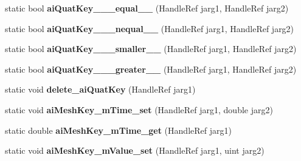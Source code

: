 \begin{DoxyCompactItemize}
\item 
\hypertarget{class_assimp_p_i_n_v_o_k_e_ade207a32ddd5e5c0709395fc4a9bd359}{static bool {\bfseries ai\+Quat\+Key\+\_\+\+\_\+\+\_\+equal\+\_\+\+\_\+} (Handle\+Ref jarg1, Handle\+Ref jarg2)}\label{class_assimp_p_i_n_v_o_k_e_ade207a32ddd5e5c0709395fc4a9bd359}

\item 
\hypertarget{class_assimp_p_i_n_v_o_k_e_a4d29858045ee8985313385b4518e2780}{static bool {\bfseries ai\+Quat\+Key\+\_\+\+\_\+\+\_\+nequal\+\_\+\+\_\+} (Handle\+Ref jarg1, Handle\+Ref jarg2)}\label{class_assimp_p_i_n_v_o_k_e_a4d29858045ee8985313385b4518e2780}

\item 
\hypertarget{class_assimp_p_i_n_v_o_k_e_a38a01fd38b68fd1f6158520353704a3c}{static bool {\bfseries ai\+Quat\+Key\+\_\+\+\_\+\+\_\+smaller\+\_\+\+\_\+} (Handle\+Ref jarg1, Handle\+Ref jarg2)}\label{class_assimp_p_i_n_v_o_k_e_a38a01fd38b68fd1f6158520353704a3c}

\item 
\hypertarget{class_assimp_p_i_n_v_o_k_e_a57720d5b6dbc566f38168deb5caab59e}{static bool {\bfseries ai\+Quat\+Key\+\_\+\+\_\+\+\_\+greater\+\_\+\+\_\+} (Handle\+Ref jarg1, Handle\+Ref jarg2)}\label{class_assimp_p_i_n_v_o_k_e_a57720d5b6dbc566f38168deb5caab59e}

\item 
\hypertarget{class_assimp_p_i_n_v_o_k_e_a9b98fd9e5620c70d40d9e254689a278e}{static void {\bfseries delete\+\_\+ai\+Quat\+Key} (Handle\+Ref jarg1)}\label{class_assimp_p_i_n_v_o_k_e_a9b98fd9e5620c70d40d9e254689a278e}

\item 
\hypertarget{class_assimp_p_i_n_v_o_k_e_ae48f471e0efaae8022b012ff980857b1}{static void {\bfseries ai\+Mesh\+Key\+\_\+m\+Time\+\_\+set} (Handle\+Ref jarg1, double jarg2)}\label{class_assimp_p_i_n_v_o_k_e_ae48f471e0efaae8022b012ff980857b1}

\item 
\hypertarget{class_assimp_p_i_n_v_o_k_e_a9c663c224be14c7a9dd6becad740078a}{static double {\bfseries ai\+Mesh\+Key\+\_\+m\+Time\+\_\+get} (Handle\+Ref jarg1)}\label{class_assimp_p_i_n_v_o_k_e_a9c663c224be14c7a9dd6becad740078a}

\item 
\hypertarget{class_assimp_p_i_n_v_o_k_e_af56aa129f4c0d5fc6985f8fb04e66222}{static void {\bfseries ai\+Mesh\+Key\+\_\+m\+Value\+\_\+set} (Handle\+Ref jarg1, uint jarg2)}\label{class_assimp_p_i_n_v_o_k_e_af56aa129f4c0d5fc6985f8fb04e66222}


\end{DoxyCompactItemize}
